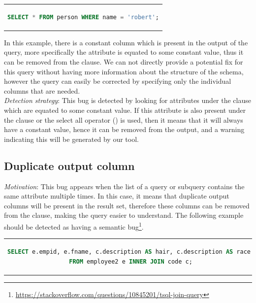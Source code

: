 \begin{center}
\begin{tabular}{c}
\begin{lstlisting}[language=SQL]
SELECT * FROM person WHERE name = 'robert';
\end{lstlisting}
\end{tabular}
\end{center}

In this example, there is a constant column which is present in the output of the query, more specifically the  attribute is equated to some constant value, thus it can be removed from the  clause. We can not directly provide a potential fix for this query without having more information about the structure of the  schema, however the query can easily be corrected by specifying only the individual columns that are needed.\\

\noindent \emph{Detection strategy}: This bug is detected by looking for attributes under the  clause which are equated to some constant value. If this attribute is also present under the  clause or the select all operator (\sql{*}) is used, then it means that it will always have a constant value, hence it can be removed from the output, and a warning indicating this will be generated by our tool.

\subsection{Duplicate output column}
\emph{Motivation}: This bug appears when the  list of a query or subquery contains the same attribute multiple times. In this case, it means that duplicate output columns will be present in the result set, therefore these columns can be removed from the  clause, making the query easier to understand. The following example should be detected as having a semantic bug\footnote{\url{https://stackoverflow.com/questions/10845201/tsql-join-query}}.

\begin{center}
\begin{tabular}{c}
\begin{lstlisting}[language=SQL]
SELECT e.empid, e.fname, c.description AS hair, c.description AS race 
FROM employee2 e INNER JOIN code c;
\end{lstlisting}
\end{tabular}
\end{center}

